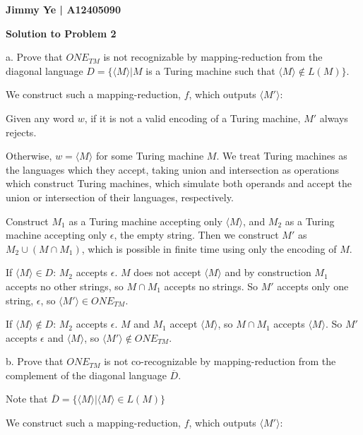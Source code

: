 \documentclass[letterpaper,12pt]{article}
\begin{document}
\pagebreak

\noindent\textbf{Jimmy Ye | A12405090}

\noindent\textbf{Solution to Problem 2}

a. Prove that $ONE_{TM}$ is not recognizable by mapping-reduction from the diagonal language $D = \{\langle M \rangle | M$ is a Turing machine such that $\langle M \rangle \notin L(M)\}$.

\vspace{3mm}

We construct such a mapping-reduction, $f$, which outputs $\langle M' \rangle$:

Given any word $w$, if it is not a valid encoding of a Turing machine, $M'$ always rejects.

Otherwise, $w = \langle M \rangle$ for some Turing machine $M$. We treat Turing machines as the languages which they accept, taking union and intersection as operations which construct Turing machines, which simulate both operands and accept the union or intersection of their languages, respectively.

Construct $M_1$ as a Turing machine accepting only $\langle M \rangle$, and $M_2$ as a Turing machine accepting only $\epsilon$, the empty string. Then we construct $M'$ as $M_2 \cup (M \cap M_1)$, which is possible in finite time using only the encoding of $M$.

If $\langle M \rangle \in D$: $M_2$ accepts $\epsilon$. $M$ does not accept $\langle M \rangle$ and by construction $M_1$ accepts no other strings, so $M \cap M_1$ accepts no strings. So $M'$ accepts only one string, $\epsilon$, so $\langle M' \rangle \in ONE_{TM}$.

If $\langle M \rangle \notin D$: $M_2$ accepts $\epsilon$. $M$ and $M_1$ accept $\langle M \rangle$, so $M \cap M_1$ accepts $\langle M \rangle$. So $M'$ accepts $\epsilon$ and $\langle M \rangle$, so $\langle M' \rangle \notin ONE_{TM}$.

\vspace{3mm}

b. Prove that $ONE_{TM}$ is not co-recognizable by mapping-reduction from the complement of the diagonal language $\overline{D}$.

\vspace{3mm}

Note that $\overline{D} = \{\langle M \rangle | \langle M \rangle \in L(M)\}$

We construct such a mapping-reduction, $f$, which outputs $\langle M' \rangle$:
\end{document}
